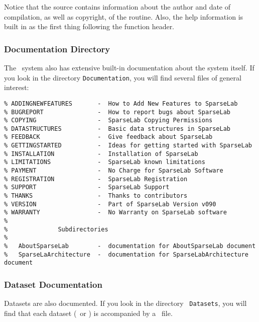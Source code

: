 \documentclass{article}
\begin{document}
Notice that the source contains information about the author and
date of compilation, as well as copyright, of the routine.  Also,
the help information is built in as the first thing following the
function header.

\subsubsection{Documentation Directory}

The \WaveLab\ system also has extensive built-in documentation about the system
itself.  If you look in the directory {\tt Documentation}, you will find several
files of general interest:

\begin{verbatim}
% ADDINGNEWFEATURES       -  How to Add New Features to SparseLab
% BUGREPORT               -  How to report bugs about SparseLab
% COPYING                 -  SparseLab Copying Permissions
% DATASTRUCTURES          -  Basic data structures in SparseLab
% FEEDBACK                -  Give feedback about SparseLab
% GETTINGSTARTED          -  Ideas for getting started with SparseLab
% INSTALLATION            -  Installation of SparseLab
% LIMITATIONS             -  SparseLab known limitations
% PAYMENT                 -  No Charge for SparseLab Software
% REGISTRATION            -  SparseLab Registration
% SUPPORT                 -  SparseLab Support
% THANKS                  -  Thanks to contributors
% VERSION                 -  Part of SparseLab Version v090
% WARRANTY                -  No Warranty on SparseLab software
%
%              Subdirectories
%
%   AboutSparseLab        -  documentation for AboutSparseLab document
%   SparseLaArchitecture  -  documentation for SparseLabArchitecture document

\end{verbatim}



\subsubsection{Dataset Documentation}

Datasets are also documented. If you look in the directory {\tt
Datasets}, you will find that each dataset (\dotraw\ or \dotasc) is
accompanied by a \dotdoc\ file.

\end{document}
